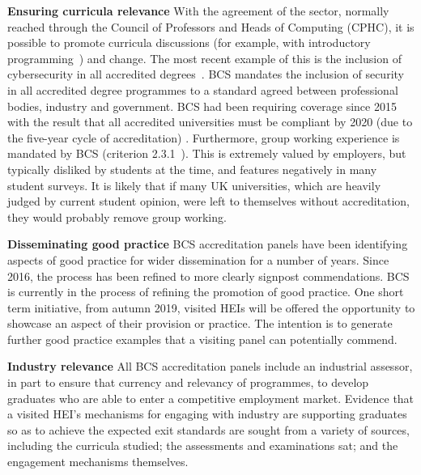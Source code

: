 \documentclass[sigconf]{acmart}
\begin{document}
{\textbf{Ensuring curricula relevance}} With the agreement of the
sector, normally reached through the Council of Professors and Heads
of Computing (CPHC), it is possible to promote curricula
discussions (for example, with introductory
programming~\cite{murphy-et-al:programming2017}) and change. The most recent
example of this is the inclusion of cybersecurity in all accredited
degrees~\cite{Cricketal2019}. BCS mandates the inclusion of security
in all accredited degree programmes to a standard agreed between
professional bodies, industry and government. BCS had been requiring
coverage since 2015 \cite[p.~17--18]{BCS2018a} with the result that
all accredited universities must be compliant by 2020 (due to the
five-year cycle of accreditation) \cite{Cricketal2019}. Furthermore,
group working experience is mandated by BCS (criterion 2.3.1~\cite
[p31] {BCS2018a}). This is extremely valued by employers, but
typically disliked by students at the time, and features negatively in
many student surveys. It is likely that if many UK universities, which
are heavily judged by current student opinion, were left to themselves
without accreditation, they would probably remove group working.


{\textbf{Disseminating good practice}} BCS accreditation panels have
been identifying aspects of good practice for wider dissemination for
a number of years. Since 2016, the process has been refined to more
clearly signpost commendations. BCS is currently in the process of
refining the promotion of good practice. One short term initiative,
from autumn 2019, visited HEIs will be offered the opportunity to
showcase an aspect of their provision or practice. The intention is to
generate further good practice examples that a visiting panel can
potentially commend.

{\textbf{Industry relevance}} All BCS accreditation panels include an
industrial assessor, in part to ensure that currency and relevancy of
programmes, to develop graduates who are able to enter a competitive
employment market. Evidence that a visited HEI's mechanisms for
engaging with industry are supporting graduates so as to achieve the
expected exit standards are sought from a variety of sources,
including the curricula studied; the assessments and examinations sat;
and the engagement mechanisms themselves.
\end{document}
